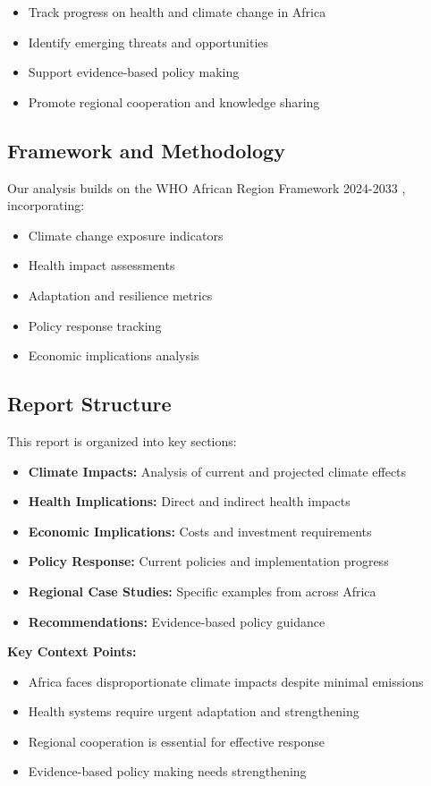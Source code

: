 \begin{itemize}
    \item Track progress on health and climate change in Africa
    \item Identify emerging threats and opportunities
    \item Support evidence-based policy making
    \item Promote regional cooperation and knowledge sharing
\end{itemize}

\subsection{Framework and Methodology}
Our analysis builds on the WHO African Region Framework 2024-2033 \citep{who2024}, incorporating:

\begin{itemize}
    \item Climate change exposure indicators
    \item Health impact assessments
    \item Adaptation and resilience metrics
    \item Policy response tracking
    \item Economic implications analysis
\end{itemize}

\subsection{Report Structure}
This report is organized into key sections:

\begin{itemize}
    \item \textbf{Climate Impacts:} Analysis of current and projected climate effects
    \item \textbf{Health Implications:} Direct and indirect health impacts
    \item \textbf{Economic Implications:} Costs and investment requirements
    \item \textbf{Policy Response:} Current policies and implementation progress
    \item \textbf{Regional Case Studies:} Specific examples from across Africa
    \item \textbf{Recommendations:} Evidence-based policy guidance
\end{itemize}

\begin{keymessage}
\textbf{Key Context Points:}
\begin{itemize}
    \item Africa faces disproportionate climate impacts despite minimal emissions
    \item Health systems require urgent adaptation and strengthening
    \item Regional cooperation is essential for effective response
    \item Evidence-based policy making needs strengthening
\end{itemize}
\end{keymessage}

